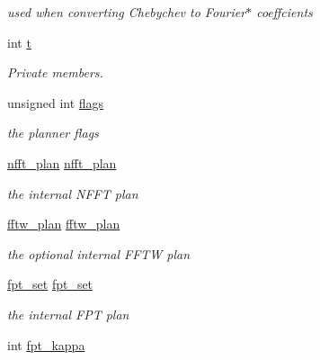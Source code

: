 \begin{CompactItemize}
\begin{CompactList}\small\item\em used when converting Chebychev to Fourier$\ast$ coeffcients \item\end{CompactList}\item 
int \hyperlink{structnfsoft__plan_e716c2f66be287f40e49df0e09f6b777}{t}
\begin{CompactList}\small\item\em Private members. \item\end{CompactList}\item 
\hypertarget{structnfsoft__plan_47a1fde8fa984c73bd2e5db3324ff4f4}{
unsigned int \hyperlink{structnfsoft__plan_47a1fde8fa984c73bd2e5db3324ff4f4}{flags}}
\label{structnfsoft__plan_47a1fde8fa984c73bd2e5db3324ff4f4}

\begin{CompactList}\small\item\em the planner flags \item\end{CompactList}\item 
\hypertarget{structnfsoft__plan_d29c3ab33e053e3a0a28332d93304231}{
\hyperlink{structnfft__plan}{nfft\_\-plan} \hyperlink{structnfsoft__plan_d29c3ab33e053e3a0a28332d93304231}{nfft\_\-plan}}
\label{structnfsoft__plan_d29c3ab33e053e3a0a28332d93304231}

\begin{CompactList}\small\item\em the internal NFFT plan \item\end{CompactList}\item 
\hypertarget{structnfsoft__plan_586afdc9afd5e707f5900b37b4d56499}{
\hyperlink{structnfsoft__plan_586afdc9afd5e707f5900b37b4d56499}{fftw\_\-plan} \hyperlink{structnfsoft__plan_586afdc9afd5e707f5900b37b4d56499}{fftw\_\-plan}}
\label{structnfsoft__plan_586afdc9afd5e707f5900b37b4d56499}

\begin{CompactList}\small\item\em the optional internal FFTW plan \item\end{CompactList}\item 
\hypertarget{structnfsoft__plan_3599e1524573f9796277406acde9628f}{
\hyperlink{structnfsoft__plan_3599e1524573f9796277406acde9628f}{fpt\_\-set} \hyperlink{structnfsoft__plan_3599e1524573f9796277406acde9628f}{fpt\_\-set}}
\label{structnfsoft__plan_3599e1524573f9796277406acde9628f}

\begin{CompactList}\small\item\em the internal FPT plan \item\end{CompactList}\item 
\hypertarget{structnfsoft__plan_af9177dc2e45502fe9a7f2331ae1872f}{
int \hyperlink{structnfsoft__plan_af9177dc2e45502fe9a7f2331ae1872f}{fpt\_\-kappa}}
\label{structnfsoft__plan_af9177dc2e45502fe9a7f2331ae1872f}

\end{CompactItemize}


